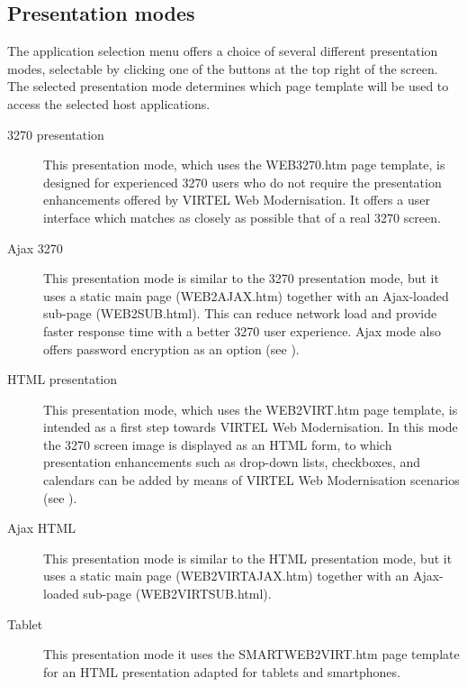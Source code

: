\documentclass[letterpaper,10pt,english]{sphinxmanual}
\begin{document}
\subsection{Presentation modes}
\label{\detokenize{User_Guide:presentation-modes}}\label{\detokenize{User_Guide:v457ug-presentation-modes}}
The application selection menu offers a choice of several different presentation modes, selectable by clicking one of the buttons at the top right of the screen. The selected presentation mode determines which page template will be used to access the selected host applications.
\begin{description}
\item[{3270 presentation}] \leavevmode
This presentation mode, which uses the WEB3270.htm page template, is designed for experienced 3270 users who do not require the presentation enhancements offered by VIRTEL Web Modernisation. It offers a user interface which matches as closely as possible that of a real 3270 screen.

\item[{Ajax 3270}] \leavevmode
This presentation mode is similar to the 3270 presentation mode, but it uses a static main page (WEB2AJAX.htm) together with an Ajax-loaded sub-page (WEB2SUB.html). This can reduce network load and provide faster response time with a better 3270 user experience. Ajax mode also offers password encryption as an option (see {\hyperref[\detokenize{User_Guide:v457ug-password-encryption}]{}}).

\item[{HTML presentation}] \leavevmode
This presentation mode, which uses the WEB2VIRT.htm page template, is intended as a first step towards VIRTEL Web Modernisation. In this mode the 3270 screen image is displayed as an HTML form, to which presentation enhancements such as drop-down lists, checkboxes, and calendars can be added by means of VIRTEL Web Modernisation scenarios (see {\hyperref[\detokenize{User_Guide:v457ug-virtel-scenarios}]{}}).

\item[{Ajax HTML}] \leavevmode
This presentation mode is similar to the HTML presentation mode, but it uses a static main page (WEB2VIRTAJAX.htm) together with an Ajax-loaded sub-page (WEB2VIRTSUB.html).

\item[{Tablet}] \leavevmode
This presentation mode it uses the SMARTWEB2VIRT.htm page template for an HTML presentation adapted for tablets and smartphones.

\end{description}
\end{document}
